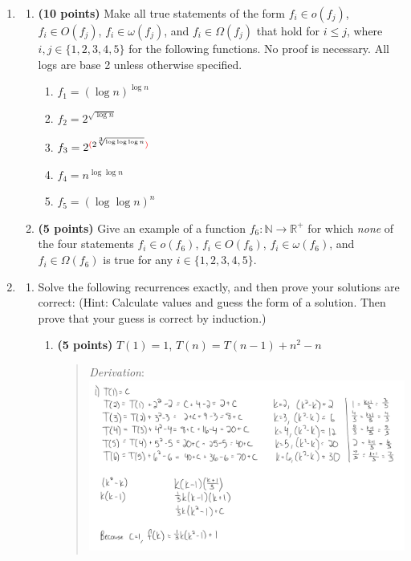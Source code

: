 \documentclass[11pt]{article}
\begin{document}
\begin{enumerate}[leftmargin=*]
\item
\begin{enumerate}
\item
{\bf (10 points)}
Make all true statements of the form $f_i \in o(f_j)$, $f_i \in O(f_j)$, $f_i \in \omega(f_j)$, and $f_i \in \Omega(f_j)$ that hold for $i \le j$, where $i, j \in \{1,2,3,4,5\}$ for the following functions. No proof is necessary. All logs are base 2 unless otherwise specified.
\begin{enumerate}
\item $f_1 = (\log n)^{\log n}$
\item $f_2 = 2^{\sqrt{\log n}}$
\item $f_3 = 2^{{\color{red}(}2^{\sqrt[3]{\log\log\log n}}{\color{red})}}$
\item $f_4 = n^{\log\log n}$
\item $f_5 = (\log\log n)^n$
\end{enumerate}
\item
{\bf (5 points)}
Give an example of a function $f_6: \mathbb{N} \to \mathbb{R}^+$ for which \emph{none} of the four statements $f_i \in o(f_6)$, $f_i \in O(f_6)$, $f_i \in \omega(f_6)$, and $f_i \in \Omega(f_6)$ is true for any $i \in \{1,2,3,4,5\}$.
\end{enumerate}

\item \begin{enumerate}
    \item Solve the following recurrences exactly, and then prove your solutions are correct:
    (Hint: Calculate values and guess the form of a solution. Then prove that your guess is correct by induction.)
    \begin{enumerate}
        \item
        {\bf (5 points)} 
        $T(1) = 1$, $T(n) = T(n-1) + n^2 - n$
        \begin{quote}
          \color{purple}
          \medskip
          \textit{Derivation}: \\
          \includegraphics[width=0.8\linewidth]{"./pics/4ai.png"}


\end{quote}
\end{enumerate}
\end{enumerate}
\end{enumerate}
\end{document}
